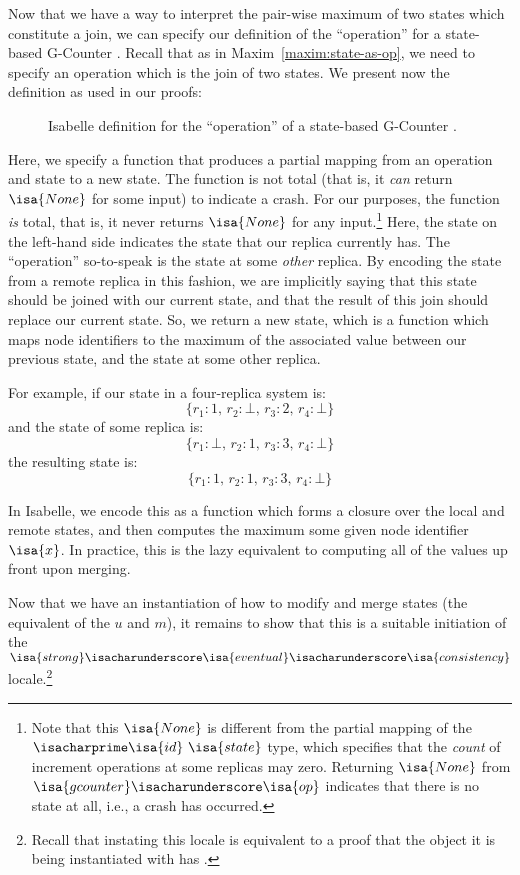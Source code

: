 Now that we have a way to interpret the pair-wise maximum of two states which
constitute a join, we can specify our definition of the ``operation'' for a
state-based G-Counter \CRDT. Recall that as in Maxim~\ref{maxim:state-as-op}, we
need to specify an operation which is the join of two states. We present now the
definition as used in our proofs:

\begin{figure}[H]
  
  \caption{Isabelle definition for the ``operation'' of a state-based G-Counter
    \CRDT.}
\end{figure}

Here, we specify a function that produces a partial mapping from an operation
and state to a new state. The function is not total (that is, it \emph{can}
return $\isa{None}$ for some input) to indicate a crash. For our purposes, the
function \emph{is} total, that is, it never returns $\isa{None}$ for any
input.\footnote{Note that this $\isa{None}$ is different from the partial
mapping of the $\isacharprime\isa{id}~\isa{state}$ type, which specifies that
the \emph{count} of increment operations at some replicas may zero. Returning
$\isa{None}$ from $\isa{gcounter}\isacharunderscore\isa{op}$ indicates that
there is no state at all, i.e., a crash has occurred.} Here, the state on the
left-hand side indicates the state that our replica currently has. The
``operation'' so-to-speak is the state at some \emph{other} replica. By encoding
the state from a remote replica in this fashion, we are implicitly saying that
this state should be joined with our current state, and that the result of this
join should replace our current state. So, we return a new state, which is a
function which maps node identifiers to the maximum of the associated value
between our previous state, and the state at some other replica.

For example, if our state in a four-replica system is:
\[
  \{ r_1 : 1,\, r_2 : \bot,\, r_3 : 2,\, r_4 : \bot \}
\]
and the state of some replica is:
\[
  \{ r_1 : \bot,\, r_2 : 1,\, r_3 : 3,\, r_4 : \bot \}
\]
the resulting state is:
\[
  \{ r_1 : 1,\, r_2 : 1,\, r_3 : 3,\, r_4 : \bot \}
\]

In Isabelle, we encode this as a function which forms a closure over the local
and remote states, and then computes the maximum some given node identifier
$\isa{x}$. In practice, this is the lazy equivalent to computing all of the
values up front upon merging.

Now that we have an instantiation of how to modify and merge states (the
equivalent of the $u$ and $m$), it remains to show that this is a suitable
initiation of the
$\isa{strong}\isacharunderscore\isa{eventual}\isacharunderscore\isa{consistency}$
locale.\footnote{Recall that instating this locale is equivalent to a proof that
the object it is being instantiated with has \SEC.}

